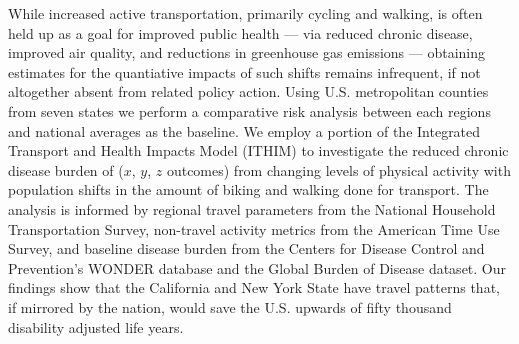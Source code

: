 While increased active transportation, primarily cycling and walking,
is often held up as a goal for improved public health --- via reduced
chronic disease, improved air quality, and reductions in greenhouse
gas emissions — obtaining estimates for the quantiative impacts of
such shifts remains infrequent, if not altogether absent from related
policy action. Using U.S. metropolitan counties from seven states we
perform a comparative risk analysis between each regions and national
averages as the baseline.  We employ a portion of the Integrated
Transport and Health Impacts Model (ITHIM) to investigate the reduced
chronic disease burden of ($x$, $y$, $z$ outcomes) from changing
levels of physical activity with population shifts in the amount of
biking and walking done for transport. The analysis is informed by
regional travel parameters from the National Household Transportation
Survey, non-travel activity metrics from the American Time Use Survey,
and baseline disease burden from the Centers for Disease Control and
Prevention's WONDER database and the Global Burden of Disease dataset.
Our findings show that the California and New York State have travel
patterns that, if mirrored by the nation, would save the U.S. upwards
of fifty thousand disability adjusted life years.







